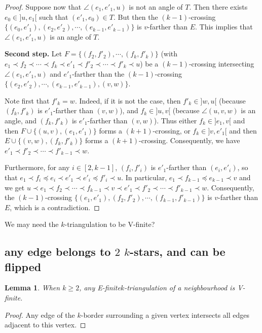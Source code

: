 \documentclass{amsart}
\newtheorem{lemma}[theorem]{Lemma}
\theoremstyle{remark}
\newcommand*{\nbd}[0]{neighbourhood\xspace}
\newcommand*{\ef}[0]{E-finite\xspace}
\newcommand*{\vf}[0]{V-finite\xspace}
\newcommand*{\ktg}[0]{$k$-triangulation\xspace}
\newcommand{\cl}{\prec}
\newcommand{\cle}{\preccurlyeq}
\begin{document}
\begin{proof}
Suppose now that $\angle(e_1, e'_1, u)$ is not an angle of $T$. 
Then there exists $e_0 \in ]u, e_1[$ such that $(e'_1, e_0) \in  T$. 
But then the $(k - 1)$-crossing $\{(e_0, e'_1), (e_2,e'_2), \cdots , (e_{k-1},e'_{k-1})\}$ is $v$-farther than $E$. 
This implies that $\angle(e_1, e'_1, u)$ is an angle of $T$.



{\bf Second step.}
Let $F=\{(f_2,f'_2), \cdots , (f_{k},f'_{k})\}$ (with $e_1 \cl f_2 \cl \cdots \cl f_{k} \cl e'_1 \cl f'_2 \cl \cdots \cl f'_{k} \cl u$) be a $(k - 1)$-crossing intersecting $\angle(e_1, e'_1, u)$ and $e'_1$-farther than the $(k-1)$-crossing $\{(e_2,e'_2), \cdots , (e_{k-1},e'_{k-1}), (v, w)\}$.

Note first that $f'_{k} = w$. 
Indeed, if it is not the case, then $f'_{k} \in ]w, u[$ (because $(f_k,f'_k)$ is $e'_1$-farther than $(v,w)$), and $f_{k} \in ]u,v[$ (because $\angle(u, v, w)$ is an angle, and $(f_k,f'_k)$ is $e'_1$-farther than $(v,w)$).
Thus either $f_k \in ]e_1, v[$ and then $F \cup \{(u, v), (e_1,e'_1)\}$ forms a $(k + 1)$-crossing, or $f_k \in ]v, e'_1[$ and then $E \cup \{(v,w),(f_k, f'_k)\}$ forms a $(k + 1)$-crossing. 
Consequently, we have $e'_1 \cl f'_2 \cl \cdots \cl f'_{k-1} \cl w$.

Furthermore, for any $i\in[2,k-1]$, $(f_i,f'_i)$ is $e'_1$-farther than $(e_i,e'_i)$, so that $e_1 \cl f_i \cle e_i \cl e'_1 \cl e'_i \cle f'_i \cl u$. 
In particular, $e_1 \cl f_{k-1} \cle e_{k-1} \cl v$ and we get $u \cl e_1 \cl f_2 \cl \cdots \cl f_{k-1} \cl v \cl e'_1 \cl f'_2 \cl \cdots \cl f'_{k-1} \cl w$.
Consequently, the $(k - 1)$-crossing $\{(e_1,e'_1), (f_2,f'_2), \cdots , (f_{k-1},f'_{k-1})\}$ is $v$-farther than $E$, which is a contradiction.











\end{proof}

We may need the \ktg to be \vf?

\subsection{any edge belongs to $2$ $k$-stars, and can be flipped}

\begin{lemma}
When $k\geq 2$, any \ef \ktg of a \nbd is \vf.
\end{lemma}
\begin{proof}
Any edge of the $k$-border surrounding a given vertex intersects all edges adjacent to this vertex.
\end{proof}
\end{document}
